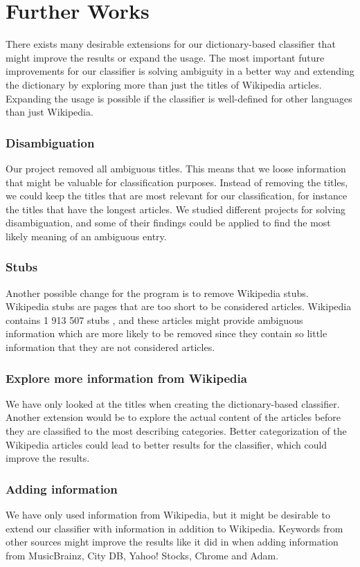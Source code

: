 \section{Further Works}
There exists many desirable extensions for our dictionary-based classifier that might improve the results or expand the usage. The most important future improvements for our classifier is solving ambiguity in a better way and extending the dictionary by exploring more than just the titles of Wikipedia articles. Expanding the usage is possible if the classifier is well-defined for other languages than just Wikipedia. 

\subsubsection{Disambiguation}
Our project removed all ambiguous titles. This means that we loose information that might be valuable for classification purposes. Instead of removing the titles, we could keep the titles that are most relevant for our classification, for instance the titles that have the longest articles. We studied different projects for solving disambiguation, and some of their findings could be applied to find the most likely meaning of an ambiguous entry. 

\subsubsection{Stubs}
Another possible change for the program is to remove Wikipedia stubs. Wikipedia stubs are pages that are too short to be considered articles. Wikipedia contains 1 913 507 stubs \cite{wiki:allstubs}, and these articles might provide ambiguous information which are more likely to be removed since they contain so little information that they are not considered articles.  


\subsubsection{Explore more information from Wikipedia}
We have only looked at the titles when creating the dictionary-based classifier. Another extension would be to explore the actual content of the articles before they are classified to the most describing categories. Better categorization of the Wikipedia articles could lead to better results for the classifier, which could improve the results. 

\subsubsection{Adding information}
We have only used information from Wikipedia, but it might be desirable to extend our classifier with information in addition to Wikipedia. Keywords from other sources might improve the results like it did in \cite{entityextraction} when adding information from MusicBrainz, City DB, Yahoo! Stocks, Chrome and Adam. 

